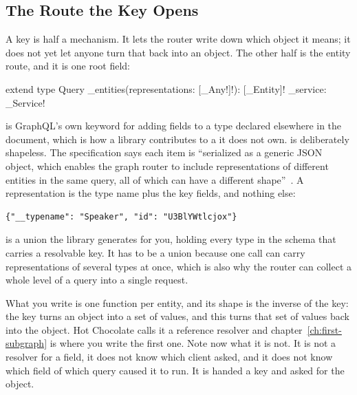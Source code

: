 \subsection{The Route the Key Opens}

%
A key is half a mechanism. It lets the router write down which object it means;
it does not yet let anyone turn that back into an object. The other half is the
entity route, and it is one root field:

\begin{graphqlsdl}
extend type Query {
  _entities(representations: [_Any!]!): [_Entity]!
  _service: _Service!
}
\end{graphqlsdl}

%
 is GraphQL's own keyword for adding fields to a type declared
elsewhere in the document, which is how a library contributes to a
 it does not own.
%
 is deliberately shapeless. The specification says each item is
\enquote{serialized as a generic JSON object, which enables the graph router to
include representations of different entities in the same query, all of which
can have a different shape}~\autocite{apollosubgraphspec}. A representation is
the type name plus the key fields, and nothing else:

\begin{verbatim}
{"__typename": "Speaker", "id": "U3BlYWtlcjox"}
\end{verbatim}

%
 is a union the library generates for you, holding every type in
the schema that carries a resolvable key. It has to be a union because one call
can carry representations of several types at once, which is also why the router
can collect a whole level of a query into a single request.

%
What you write is one function per entity, and its shape is the inverse of the
key: the key turns an object into a set of values, and this turns that set of
values back into the object. Hot Chocolate calls it a reference resolver and
chapter~\ref{ch:first-subgraph} is where you write the first one. Note now what
it is not. It is not a resolver for a field, it does not know which client
asked, and it does not know which field of which query caused it to run. It is
handed a key and asked for the object.

